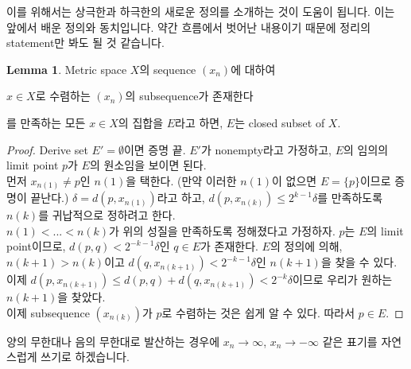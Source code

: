 \documentclass[12pt]{article}
\theoremstyle{definition}
\newtheorem{lem}[thm]{Lemma}
\begin{document}
이를 위해서는 상극한과 하극한의 새로운 정의를 소개하는 것이 도움이 됩니다. 이는 앞에서 배운 정의와 동치입니다. 약간 흐름에서 벗어난 내용이기 때문에 정리의 statement만 봐도 될 것 같습니다.

	\begin{lem}
		Metric space \(X\)의 sequence \((x_n)\)에 대하여
		\begin{center}
			\(x \in X\)로 수렴하는 \((x_n)\)의 subsequence가 존재한다
		\end{center}
		를 만족하는 모든 \(x \in X\)의 집합을 \(E\)라고 하면, \(E\)는 closed subset of \(X\).
	\end{lem}
	\begin{proof}
		Derive set \(E' = \emptyset\)이면 증명 끝. \(E'\)가 nonempty라고 가정하고, \(E\)의 임의의 limit point \(p\)가 \(E\)의 원소임을 보이면 된다.\\
		먼저 \(x_{n(1)} \neq p\)인 \(n(1)\)을 택한다. (만약 이러한 \(n(1)\)이 없으면 \(E = \{p\}\)이므로 증명이 끝난다.) \(\delta = d(p, x_{n(1)})\)라고 하고, \(d(p, x_{n(k)}) \le 2^{k-1} \delta\)를 만족하도록 \(n(k)\)를 귀납적으로 정하려고 한다. \\
		\(n(1) < ... < n(k)\)가 위의 성질을 만족하도록 정해졌다고 가정하자. \(p\)는 \(E\)의 limit point이므로, \(d(p, q) < 2^{-k-1} \delta\)인 \(q \in E\)가 존재한다. \(E\)의 정의에 의해, \(n(k+1) > n(k)\)이고 \(d(q, x_{n(k+1)}) < 2^{-k-1}\delta\)인 \(n(k+1)\)을 찾을 수 있다. 이제 \(d(p, x_{n(k+1)}) \le d(p, q) + d(q, x_{n(k+1)}) < 2^{-k} \delta\)이므로 우리가 원하는 \(n(k+1)\)을 찾았다.\\
		이제 subsequence \((x_{n(k)})\)가 \(p\)로 수렴하는 것은 쉽게 알 수 있다. 따라서 \(p \in E\).
	\end{proof}

양의 무한대나 음의 무한대로 발산하는 경우에 \(x_n \rightarrow \infty\), \(x_n \rightarrow -\infty\) 같은 표기를 자연스럽게 쓰기로 하겠습니다.
\end{document}
